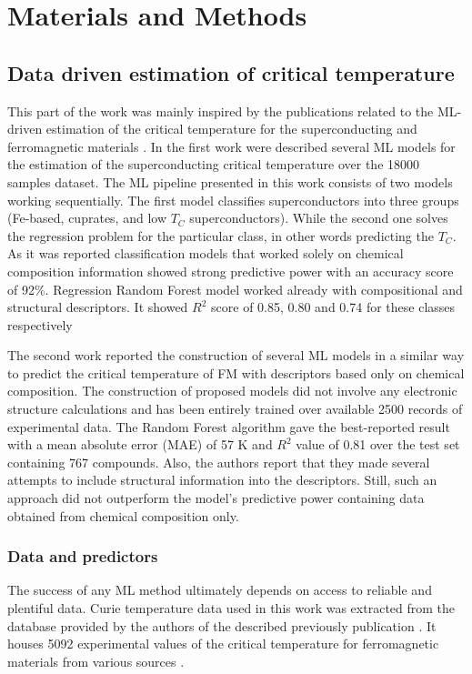 \chapter{Materials and Methods}

\section{Data driven estimation of critical temperature}
\label{section:ML_models}
This part of the work was mainly inspired by the publications related to the ML-driven estimation of the critical temperature for the superconducting  \cite{Stanev:2018uk} and ferromagnetic materials \cite{Nelson:2019ui}.
In the first work \cite{Stanev:2018uk} were described several ML models for the estimation of the superconducting critical temperature over the 18000 samples dataset. The ML pipeline presented in this work consists of two models working sequentially. The first model classifies superconductors into three groups (Fe-based, cuprates, and low $T_C$ superconductors). While the second one solves the regression problem for the particular class, in other words predicting the $T_C$.  As it was reported classification models that worked solely on chemical composition information showed strong predictive power with an accuracy score of 92\%. Regression Random Forest model worked already with compositional and structural descriptors. It showed $R^2$ score of 0.85, 0.80 and 0.74 for these classes respectively

The second work \cite{Nelson:2019ui} reported the construction of several ML models in a similar way to predict the critical temperature of FM with descriptors based only on chemical composition.  The construction of proposed models did not involve any electronic structure calculations and has been entirely trained over available 2500 records of experimental data. The Random Forest algorithm gave the best-reported result with a mean absolute error (MAE) of 57 K and $R^2$ value of 0.81 over the test set containing 767 compounds. 
Also, the authors report that they made several attempts to include structural information into the descriptors. Still, such an approach did not outperform the model's predictive power containing data obtained from chemical composition only.

\subsection{Data and predictors}
The success of any ML method ultimately depends on access to reliable and plentiful data. Curie temperature data used in this work was extracted from the database provided by the authors of the described previously publication \cite{Nelson:2019ui}.  It houses 5092 experimental values of the critical temperature for ferromagnetic materials from various sources \cite{Xu2011InorganicMD,  osti_4549319}.

